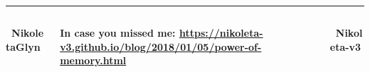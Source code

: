 \documentclass[usenames,dvipsnames,t]{beamer}
\begin{document}
\vspace{1.5cm}

\hrule height 3pt
\begin{columns}
    \begin{column}{.2\linewidth}

        \centering
        \textbf{ \faTwitter \ NikoletaGlyn}
    \end{column}
    \begin{column}{.6\linewidth}

        \centering
        \textbf{ In case you missed me: \url{https://nikoleta-v3.github.io/blog/2018/01/05/power-of-memory.html}}
    \end{column}
    \begin{column}{.2\linewidth}

        \centering
        \textbf{ \faGithub \ Nikoleta-v3}
    \end{column}
\end{columns}
\end{document}
